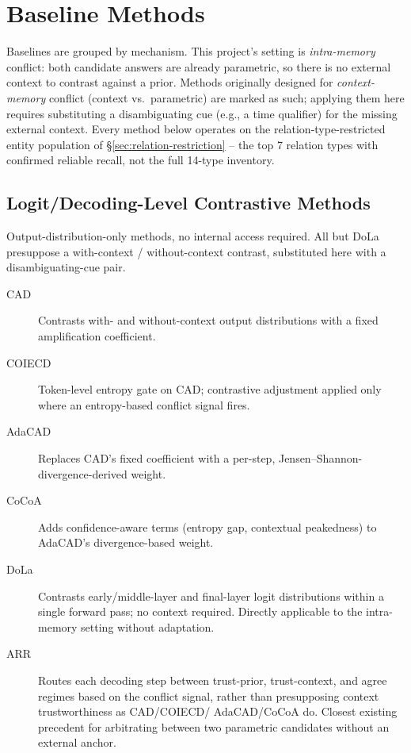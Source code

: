 \documentclass[11pt]{article}
\begin{document}
\section{Baseline Methods}

Baselines are grouped by mechanism. This project's setting is
\emph{intra-memory} conflict: both candidate answers are already parametric,
so there is no external context to contrast against a prior. Methods
originally designed for \emph{context-memory} conflict (context vs.\
parametric) are marked as such; applying them here requires substituting a
disambiguating cue (e.g., a time qualifier) for the missing external context.
Every method below operates on the relation-type-restricted entity
population of \S\ref{sec:relation-restriction} -- the top 7 relation types
with confirmed reliable recall, not the full 14-type inventory.

\subsection{Logit/Decoding-Level Contrastive Methods}
\label{sec:decoding}

Output-distribution-only methods, no internal access required. All but DoLa
presuppose a with-context / without-context contrast, substituted here with a
disambiguating-cue pair.

\begin{description}
  \item[CAD] \citep{shi2023trusting} Contrasts with- and without-context
    output distributions with a fixed amplification coefficient.
  \item[COIECD] \citep{yuan2024discerning} Token-level entropy gate on CAD;
    contrastive adjustment applied only where an entropy-based conflict
    signal fires.
  \item[AdaCAD] \citep{wang2024adacad} Replaces CAD's fixed coefficient with a
    per-step, Jensen--Shannon-divergence-derived weight.
  \item[CoCoA] \citep{khandelwal2025cocoa} Adds confidence-aware terms
    (entropy gap, contextual peakedness) to AdaCAD's divergence-based weight.
  \item[DoLa] \citep{chuang2023dola} Contrasts early/middle-layer and
    final-layer logit distributions within a single forward pass; no context
    required. Directly applicable to the intra-memory setting without
    adaptation.
  \item[ARR] \citep{jiang2026contextaware} Routes each decoding step between
    trust-prior, trust-context, and agree regimes based on the conflict
    signal, rather than presupposing context trustworthiness as CAD/COIECD/
    AdaCAD/CoCoA do. Closest existing precedent for arbitrating between two
    parametric candidates without an external anchor.
\end{description}
\end{document}
